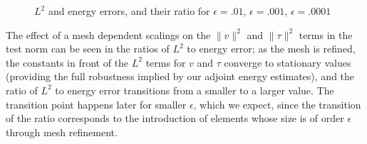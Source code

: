 \documentclass[11pt,onecolumn]{scrartcl}
\begin{document}
\begin{figure}[h!]
\centering
{}
\caption{$L^2$ and energy errors, and their ratio for $\epsilon=.01$, $\epsilon=.001$, $\epsilon=.0001$}
\label{ratios_simple}
\end{figure}
The effect of a mesh dependent scalings on the $\|v\|^2$ and $\|\tau\|^2$ terms in the test norm can be seen in the ratios of $L^2$ to energy error; as the mesh is refined, the constants in front of the $L^2$ terms for $v$ and $\tau$ converge to stationary values (providing the full robustness implied by our adjoint energy estimates), and the ratio of $L^2$ to energy error transitions from a smaller to a larger value.  The transition point happens later for smaller $\epsilon$, which we expect, since the transition of the ratio corresponds to the introduction of elements whose size is of order $\epsilon$ through mesh refinement. 
\end{document}
